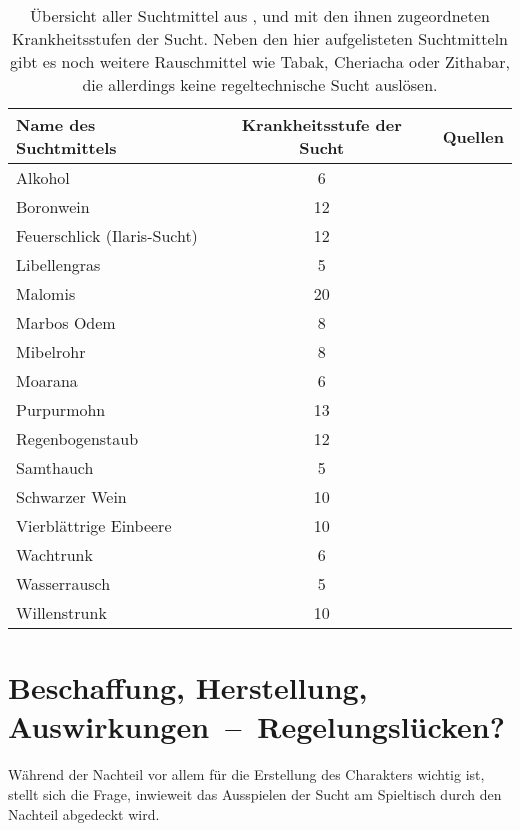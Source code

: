\begin{table}
	\centering
	\caption[Suchtmittel aus ,  und ]{Übersicht aller Suchtmittel aus ,  und  mit den ihnen zugeordneten Krankheitsstufen der Sucht. Neben den hier aufgelisteten Suchtmitteln gibt es noch weitere Rauschmittel wie Tabak, Cheriacha oder Zithabar, die allerdings keine regeltechnische Sucht auslösen. \cite[S.~271]{WdH}\label{tbl-suchtmittel}}
	\begin{tabular}{lcr}
		\toprule
		{Name des Suchtmittels} & {Krankheitsstufe der Sucht} & {Quellen} \\
		\hline
		Alkohol & 6 & \cite[S.~271]{WdH} \\
		Boronwein & 12 & \cite[S.~271]{WdH}\cite[S.~272]{ZBA} \\
		Feuerschlick (Ilaris-Sucht) & 12 & \cite[S.~237]{ZBA} \\
		Libellengras & 5 & \cite[S.~194]{WdA} \\
		Malomis & 20 & \cite[S.~248]{ZBA} \\
		Marbos Odem & 8 & \cite[S.~271]{WdH}\cite[S.~247]{ZBA} \\
		Mibelrohr & 8 & \cite[S.~251]{ZBA} \\
		Moarana & 6 & \cite[S.~271]{WdH}\cite[S.~201]{ZBA} \\
		Purpurmohn & 13 & \cite[S.~253]{ZBA} \\
		Regenbogenstaub & 12 & \cite[S.~63]{WdA} \\
		Samthauch & 5 & \cite[S.~271]{WdH}\cite[S.~266]{ZBA} \\
		Schwarzer Wein & 10 & \cite[S.~271]{WdH} \\
		Vierblättrige Einbeere & 10 & \cite[S.~271]{ZBA} \\
		Wachtrunk & 6 & \cite[S.~64]{WdA} \\
		Wasserrausch & 5 & \cite[S.~273]{ZBA} \\
		Willenstrunk & 10 & \cite[S.~43/44]{WdA} \\
		\bottomrule
	\end{tabular}
\end{table}

\section{Beschaffung, Herstellung, Auswirkungen~--~Regelungslücken?}
Während der Nachteil vor allem für die Erstellung des Charakters wichtig ist, stellt sich die Frage, inwieweit das Ausspielen der Sucht am Spieltisch durch den Nachteil abgedeckt wird.

